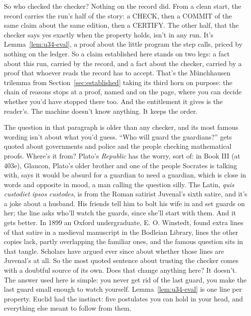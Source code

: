 \documentclass[11pt,twoside]{article}
\theoremstyle{thielethm}
\theoremstyle{thieledef}
\theoremstyle{thieledef}
\theoremstyle{thieledef}
\theoremstyle{thielethm}
\theoremstyle{thieleobs}
\theoremstyle{thielethm}
\begin{document}
So who checked the checker? Nothing on the record did. From a clean start, the record
carries the run's half of
the story: a CHECK, then a COMMIT of the same claim about the same edition, then a CERTIFY. The
other half, that the checker says yes exactly when the property holds, isn't in any run. It's
Lemma~\ref{lem:u34-eval}, a proof about the little program the step calls,
priced by nothing on the ledger. So a claim established here stands on two legs: a fact
about this run, carried by the record, and a fact about the checker, carried by a proof that
whoever reads the record has to accept. That's the Münchhausen trilemma from Section~\ref{sec:established}
taking its third horn on purpose: the chain of reasons stops at a proof, named and on the page,
where you can decide whether you'd have stopped there too. And the entitlement it gives is the
reader's. The machine doesn't know anything. It keeps the order.

The question in that paragraph is older than any checker, and its most famous wording isn't
about what you'd guess. ``Who will guard the guardians?'' gets quoted about governments and police
and the people checking mathematical proofs. Where's it from? Plato's
\emph{Republic} has the worry, sort of: in Book III (at 403e), Glaucon, Plato's older brother and
one of the people Socrates is talking with, says it would be absurd for a guardian
to need a guardian, which is close in words and opposite in mood, a man calling the question
silly. The Latin, \emph{quis custodiet ipsos custodes}, is from the Roman satirist Juvenal's sixth
satire, and it's a joke about a husband. His friends tell him to bolt his wife in and set guards
on her; the line asks who'll watch the guards, since she'll start with them. And it gets better.
In 1899 an Oxford undergraduate, E. O. Winstedt, found extra lines of that satire in a medieval
manuscript in the Bodleian Library, lines the other copies lack, partly overlapping the familiar
ones, and the famous question sits in that tangle. Scholars have argued ever since about whether
those lines are Juvenal's at all. So the most quoted sentence about trusting the checker comes
with a doubtful source of its own. Does that change anything here? It doesn't. The answer used here is simple: you never get rid of the last guard, you
make the last guard small enough to watch yourself. Lemma~\ref{lem:u34-eval} is one line per
property. Euclid had the instinct: five postulates you can hold in your head, and everything else
meant to follow from them.
\end{document}
